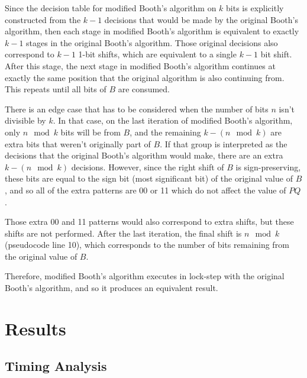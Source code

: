 \documentclass[12pt]{article}
\begin{document}
Since the decision table for modified Booth's algorithm on $k$ bits is
explicitly constructed from the $k - 1$ decisions that would be made by the
original Booth's algorithm, then each stage in modified Booth's algorithm is
equivalent to exactly $k - 1$ stages in the original Booth's algorithm. Those
original decisions also correspond to $k - 1$ 1-bit shifts, which are
equivalent to a single $k - 1$ bit shift. After this stage, the next stage in
modified Booth's algorithm continues at exactly the same position that the
original algorithm is also continuing from. This repeats until all bits of $B$
are consumed.

There is an edge case that has to be considered when the number of bits $n$
isn't divisible by $k$. In that case, on the last iteration of modified Booth's
algorithm, only $n\mod k$ bits will be from $B$, and the remaining $k - (n\mod k)$
are extra bits that weren't originally part of $B$. If that group is
interpreted as the decisions that the original Booth's algorithm would make,
there are an extra $k - (n\mod k)$ decisions. However, since the right shift of
$B$ is sign-preserving, these bits are equal to the sign bit (most significant
bit) of the original value of $B$, and so all of the extra patterns are 00 or
11 which do not affect the value of $PQ$.

Those extra 00 and 11 patterns would also correspond to extra shifts, but these
shifts are not performed. After the last iteration, the final shift is $n\mod
k$ (pseudocode line 10), which corresponds to the number of bits remaining from
the original value of $B$.

Therefore, modified Booth's algorithm executes in lock-step with the original
Booth's algorithm, and so it produces an equivalent result.

\section{Results}

\subsection{Timing Analysis}
\end{document}
